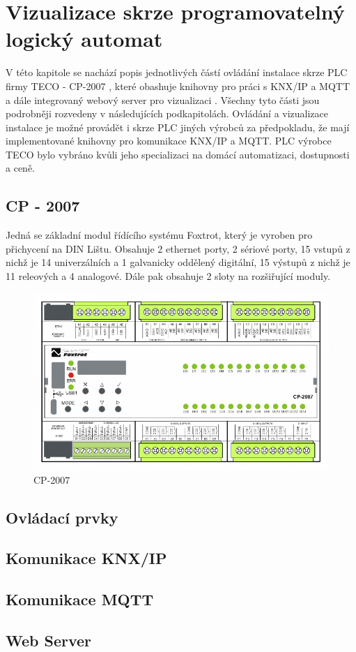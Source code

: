 \chapter{Vizualizace skrze programovatelný logický automat}
V této kapitole se nachází popis jednotlivých částí ovládání instalace skrze PLC firmy TECO - CP-2007 \cite{TECO}, které obashuje knihovny pro práci s KNX/IP \cite{KNXlib} a MQTT \cite{MQTTlib} a dále integrovaný webový server pro vizualizaci \cite{WebMaker}. Všechny tyto části jsou podrobněji rozvedeny v následujících podkapitolách.
Ovládání a vizualizace instalace je možné provádět i skrze PLC jiných výrobců za předpokladu, že mají implementované knihovny pro komunikace KNX/IP a MQTT. PLC výrobce TECO bylo vybráno kvůli jeho specializaci na domácí automatizaci, dostupnosti a ceně.
\section{CP - 2007}
Jedná se základní modul řídícího systému Foxtrot, který je vyroben pro přichycení na DIN Lištu. Obsahuje 2 ethernet porty, 2 sériové porty, 15 vstupů z nichž je 14 univerzálních a 1 galvanicky oddělený digitální, 15 výstupů z nichž je 11 releových a 4 analogové. Dále pak obsahuje 2 sloty na rozšiřující moduly. \cite{TECO}

\begin{figure}[!ht]
    \begin{center}
        \includegraphics[scale=0.7]{obrazky/CP-2007.png}
    \end{center}
    \caption[CP-2007 \cite{TECO}]{CP-2007 \cite{TECO}}
    \label{fig:CP-2007}
\end{figure}

\section{Ovládací prvky}
\section{Komunikace KNX/IP}
\section{Komunikace MQTT}
\section{Web Server}